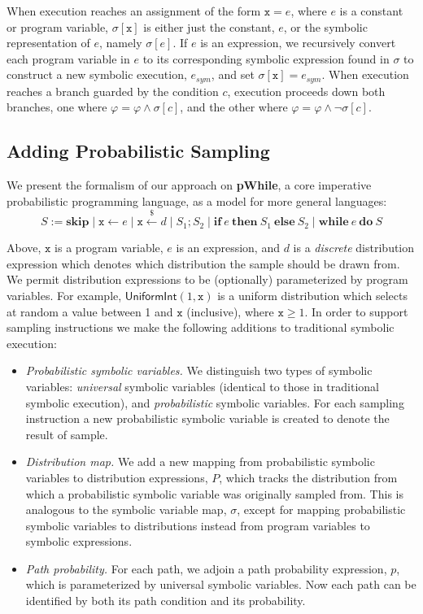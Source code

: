 %
When execution reaches an assignment of the form $\mathtt{x} = e$, where $e$ is a constant or program variable, $\sigma[\mathtt{x}]$ is either just the constant, $e$, or the symbolic representation of $e$, namely $\sigma[e]$.
% 
If $e$ is an expression, we recursively convert each program variable in $e$ to its corresponding symbolic expression found in $\sigma$ to construct a new symbolic execution, $e_{sym}$, and set $\sigma[\mathtt{x}] = e_{sym}$.
% 
When execution reaches a branch guarded by the condition $c$, execution proceeds down both branches, one where $\varphi = \varphi \wedge \sigma[c]$, and the other where $\varphi = \varphi \wedge \neg \sigma[c]$. 


\subsection{Adding Probabilistic Sampling}
We present the formalism of our approach on \textbf{pWhile}, a core imperative probabilistic programming language, as a model for more general languages:
% 
\[
S := \mathbf{skip} \mid \mathtt{x} \leftarrow e \mid \mathtt{x} \xleftarrow{\$} d \mid S_1 ; S_2 \mid \mathbf{if}~e~\mathbf{then}~S_1~\mathbf{else}~S_2 \mid \mathbf{while}~e~\mathbf{do}~S 
\]

Above, $\mathtt{x}$ is a program variable, $e$ is an expression, and $d$ is a \textit{discrete} distribution expression which denotes which distribution the sample should be drawn from.
% 
We permit distribution expressions to be (optionally) parameterized by program variables.
% 
For example, $\mathsf{UniformInt}(1,\mathtt{x})$ is a uniform distribution which selects at random a value between 1 and $\mathtt{x}$ (inclusive), where $\mathtt{x} \geq 1$.
% 
In order to support sampling instructions we make the following additions to traditional symbolic execution:
% 
\begin{itemize}
	\item \textit{Probabilistic symbolic variables.} We distinguish two types of symbolic variables: \textit{universal} symbolic variables (identical to those in traditional symbolic execution), and \textit{probabilistic} symbolic variables.
	For each sampling instruction a new probabilistic symbolic variable is created to denote the result of sample.
	\item \textit{Distribution map.} We add a new mapping from probabilistic symbolic variables to distribution expressions, $P$, which tracks the distribution from which a probabilistic symbolic variable was originally sampled from.
	This is analogous to the symbolic variable map, $\sigma$, except for mapping probabilistic symbolic variables to distributions instead from program variables to symbolic expressions.
	\item \textit{Path probability.} For each path, we adjoin a path probability expression, $p$, which is parameterized by universal symbolic variables.
	Now each path can be identified by both its path condition and its probability.
\end{itemize}

